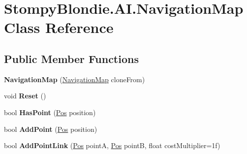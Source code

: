 \hypertarget{class_stompy_blondie_1_1_a_i_1_1_navigation_map}{}\section{Stompy\+Blondie.\+A\+I.\+Navigation\+Map Class Reference}
\label{class_stompy_blondie_1_1_a_i_1_1_navigation_map}
\subsection*{Public Member Functions}
\begin{DoxyCompactItemize}
\item 
\mbox{\label{class_stompy_blondie_1_1_a_i_1_1_navigation_map_a62f3061cd8d46288f7fee1e6c80a1b9b}} 
{\bfseries Navigation\+Map} (\mbox{\hyperlink{class_stompy_blondie_1_1_a_i_1_1_navigation_map}{Navigation\+Map}} clone\+From)
\item 
\mbox{\label{class_stompy_blondie_1_1_a_i_1_1_navigation_map_a5922bcfcb17953ec21c868b260b41953}} 
void {\bfseries Reset} ()
\item 
\mbox{\label{class_stompy_blondie_1_1_a_i_1_1_navigation_map_a10c2593b8a9fbaf0ac01095f40c12dc8}} 
bool {\bfseries Has\+Point} (\mbox{\hyperlink{struct_stompy_blondie_1_1_common_1_1_types_1_1_pos}{Pos}} position)
\item 
\mbox{\label{class_stompy_blondie_1_1_a_i_1_1_navigation_map_af6d4dcdcca40f142146538ed2fe7c21f}} 
bool {\bfseries Add\+Point} (\mbox{\hyperlink{struct_stompy_blondie_1_1_common_1_1_types_1_1_pos}{Pos}} position)
\item 
\mbox{\label{class_stompy_blondie_1_1_a_i_1_1_navigation_map_a2658ca4206a19449243d4a16393ebb85}} 
bool {\bfseries Add\+Point\+Link} (\mbox{\hyperlink{struct_stompy_blondie_1_1_common_1_1_types_1_1_pos}{Pos}} pointA, \mbox{\hyperlink{struct_stompy_blondie_1_1_common_1_1_types_1_1_pos}{Pos}} pointB, float cost\+Multiplier=1f)
\item 
\mbox{\label{class_stompy_blondie_1_1_a_i_1_1_navigation_map_ae13b0ae98c3b2309b0349439bf58ed13}} 

\end{DoxyCompactItemize}
